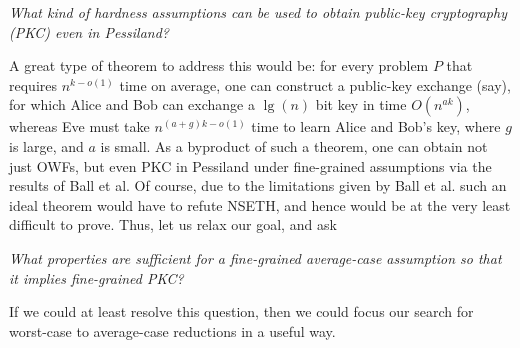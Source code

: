 \begin{center}{\em What kind of hardness assumptions can be used to obtain public-key cryptography (PKC) even in Pessiland?}\end{center} 

A great type of theorem to address this would be: for every problem $P$ that requires $n^{k-o(1)}$ time on average, one can construct a public-key exchange (say), for which Alice and Bob can exchange a $\lg(n)$ bit key in time $O(n^{ak})$, whereas Eve must take $n^{(a+g)k-o(1)}$ time to learn Alice and Bob's key, where $g$ is large, and $a$ is small. As a byproduct of such a theorem, one can obtain not just OWFs, but even PKC in Pessiland under fine-grained assumptions via the results of Ball et al. Of course, due to the limitations given by Ball et al. such an ideal theorem would have to refute NSETH, and hence would be at the very least difficult to prove.
Thus, let us relax our goal, and ask 
\begin{center}{\em What properties are sufficient for a fine-grained average-case assumption so that it implies fine-grained PKC?}\end{center} 

If we could at least resolve this question, then we could focus our search for worst-case to average-case reductions in a useful way.
